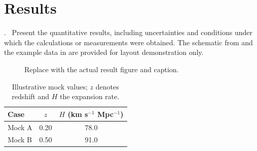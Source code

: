 \section{Results}
\label{sec:results}
\begin{alertblock}{\thesection.\ \insertsectionhead}
Present the quantitative results, including uncertainties and conditions under
which the calculations or measurements were obtained.
The schematic from  and the example data in
 are provided for layout demonstration only.
\begin{figure}
  \centering
  \setlength{\fboxsep}{0pt}%
  \caption{Replace with the actual result figure and caption.}
  \label{fig:results}
\end{figure}
\begin{table}
  \centering
  \caption{Illustrative mock values; $z$ denotes redshift and $H$ the expansion rate.}
  \label{tab:mock-example}
  \renewcommand{\arraystretch}{1.2}
  \begin{tabular}{lcc}
    \hline\hline
    Case & $z$ & $H$ (km s$^{-1}$ Mpc$^{-1}$) \\
    \hline
    Mock A & 0.20 & 78.0 \\
    Mock B & 0.50 & 91.0 \\
    \hline\hline
  \end{tabular}
\end{table}

\end{alertblock}
